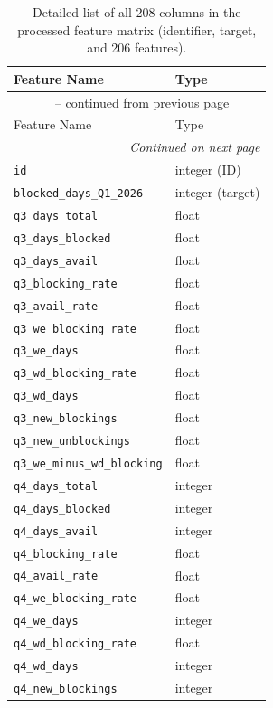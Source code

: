 \documentclass[journal]{IEEEtran}
\begin{document}
\begin{longtable}{p{2.2in}p{0.8in}}
\caption{Detailed list of all 208 columns in the processed feature matrix
(identifier, target, and 206 features).}
\label{tab:allfeatures_list} \\
\toprule
Feature Name & Type \\
\midrule
\endfirsthead
\multicolumn{2}{c}{\tablename\ \thetable{} -- continued from previous page} \\
\toprule
Feature Name & Type \\
\midrule
\endhead
\midrule
\multicolumn{2}{r}{\textit{Continued on next page}} \\
\endfoot
\bottomrule
\endlastfoot
\texttt{id} & integer (ID) \\
\texttt{blocked\_days\_Q1\_2026} & integer (target) \\
\texttt{q3\_days\_total} & float \\
\texttt{q3\_days\_blocked} & float \\
\texttt{q3\_days\_avail} & float \\
\texttt{q3\_blocking\_rate} & float \\
\texttt{q3\_avail\_rate} & float \\
\texttt{q3\_we\_blocking\_rate} & float \\
\texttt{q3\_we\_days} & float \\
\texttt{q3\_wd\_blocking\_rate} & float \\
\texttt{q3\_wd\_days} & float \\
\texttt{q3\_new\_blockings} & float \\
\texttt{q3\_new\_unblockings} & float \\
\texttt{q3\_we\_minus\_wd\_blocking} & float \\
\texttt{q4\_days\_total} & integer \\
\texttt{q4\_days\_blocked} & integer \\
\texttt{q4\_days\_avail} & integer \\
\texttt{q4\_blocking\_rate} & float \\
\texttt{q4\_avail\_rate} & float \\
\texttt{q4\_we\_blocking\_rate} & float \\
\texttt{q4\_we\_days} & integer \\
\texttt{q4\_wd\_blocking\_rate} & float \\
\texttt{q4\_wd\_days} & integer \\
\texttt{q4\_new\_blockings} & integer \\

\end{longtable}
\end{document}
